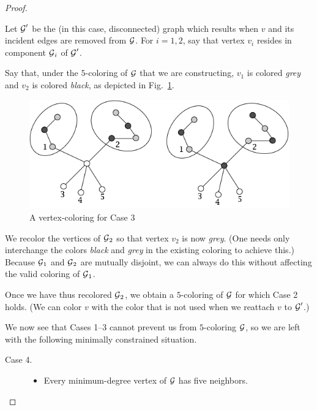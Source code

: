 \begin{proof}
\begin{description}
\smallskip

Let $\mbox{$\cal G$}'$ be the (in this case, disconnected) graph which results when $v$ and its incident edges are removed from $\mbox{$\cal G$}$.  For $i=1,2$, say that vertex $v_i$ resides in component $\mbox{$\cal G$}_i$ of $\mbox{$\cal G$}'$.

\smallskip

Say that, under the $5$-coloring of $\mbox{$\cal G$}$ that we are constructing, $v_1$ is colored {\it grey} and $v_2$ is colored {\it black}, as depicted in Fig.~\ref{fig:5colorsCase3}.
\begin{figure}[hb]
\begin{center}
   \includegraphics[scale=0.38]{FiguresGraph/5colorsCase1}
\caption{A vertex-coloring for Case 3}
  \label{fig:5colorsCase3}
\end{center}
\end{figure}

\smallskip

We recolor the vertices of $\mbox{$\cal G$}_2$ so that vertex $v_2$ is now {\it grey}.  (One needs only interchange the colors {\it black} and {\it grey} in the existing coloring to achieve this.)  Because $\mbox{$\cal G$}_1$ and $\mbox{$\cal G$}_2$ are mutually disjoint, we can always do this without affecting the valid coloring of $\mbox{$\cal G$}_1$.

\smallskip

Once we have thus recolored $\mbox{$\cal G$}_2$, we obtain a $5$-coloring of $\mbox{$\cal G$}$ for which Case 2 holds.  (We can color $v$ with the color that is not used when we reattach $v$ to $\mbox{$\cal G$}'$.)
\end{description}


\smallskip

\noindent
We now see that Cases 1--3 cannot prevent us from $5$-coloring $\mbox{$\cal G$}$, so we are left with the following minimally constrained situation.
\begin{description}
\item[{\sf Case 4}.]
\begin{itemize}
\item
Every minimum-degree vertex of $\mbox{$\cal G$}$ has five neighbors.


\end{itemize}
\end{description}
\end{proof}
